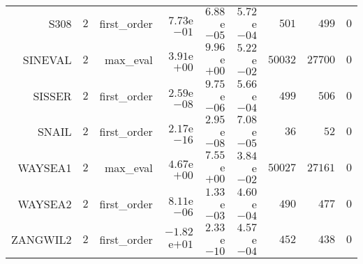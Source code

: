 \begin{longtable}{rrrrrrrrr}
S308 & \(     2\) & first\_order & \( 7.73\)e\(-01\) & \( 6.88\)e\(-05\) & \( 5.72\)e\(-04\) & \(   501\) & \(   499\) & \(     0\) \\
SINEVAL & \(     2\) & max\_eval & \( 3.91\)e\(+00\) & \( 9.96\)e\(+00\) & \( 5.22\)e\(-02\) & \( 50032\) & \( 27700\) & \(     0\) \\
SISSER & \(     2\) & first\_order & \( 2.59\)e\(-08\) & \( 9.75\)e\(-06\) & \( 5.66\)e\(-04\) & \(   499\) & \(   506\) & \(     0\) \\
SNAIL & \(     2\) & first\_order & \( 2.17\)e\(-16\) & \( 2.95\)e\(-08\) & \( 7.08\)e\(-05\) & \(    36\) & \(    52\) & \(     0\) \\
WAYSEA1 & \(     2\) & max\_eval & \( 4.67\)e\(+00\) & \( 7.55\)e\(+00\) & \( 3.84\)e\(-02\) & \( 50027\) & \( 27161\) & \(     0\) \\
WAYSEA2 & \(     2\) & first\_order & \( 8.11\)e\(-06\) & \( 1.33\)e\(-03\) & \( 4.60\)e\(-04\) & \(   490\) & \(   477\) & \(     0\) \\
ZANGWIL2 & \(     2\) & first\_order & \(-1.82\)e\(+01\) & \( 2.33\)e\(-10\) & \( 4.57\)e\(-04\) & \(   452\) & \(   438\) & \(     0\) \\\hline
\end{longtable}
